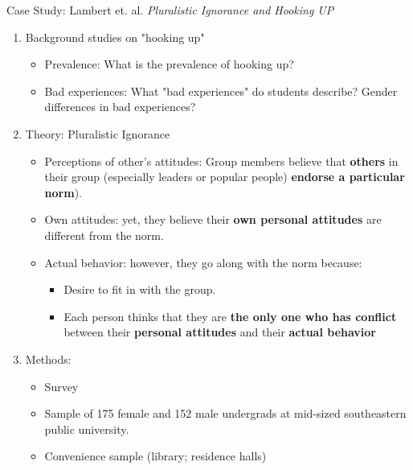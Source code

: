 \documentclass[12pt,a4paper]{article}
\begin{document}
\begin{enumerate}
\begin{enumerate}
\begin{eg}{Case Study: Lambert et. al. \textit{Pluralistic Ignorance and Hooking UP}}
\begin{enumerate}
\begin{itemize}
					\item In the post, research has assumed that sex without love is a problem (goes against norms). 
					\item Today, on college campuses, this kind of behavior ("hooking up") has become normative.
					\begin{df}{Hooking up}
						Hooking up occurs when two people who are casual acquaintances engage in some forms of sexual behavior with the expectation of no future commitment. 	
					\end{df}
				\end{itemize}
				\item Background studies on "hooking up"
				\begin{itemize}
					\item Prevalence: What is the prevalence of hooking up? 
					\item Bad experiences: What "bad experiences" do students describe? Gender differences in bad experiences? 	
				\end{itemize}
				\item Theory: Pluralistic Ignorance
				\begin{itemize}
					\item Perceptions of other's attitudes: Group members believe that \textbf{others} in their group (especially leaders or popular people) \textbf{endorse a particular norm}). 
					\item Own attitudes: yet, they believe their \textbf{own personal attitudes} are different from the norm.
					\item Actual behavior: however, they go along with the norm because: 
					\begin{itemize}
						\item Desire to fit in with the group.
						\item Each person thinks that they are \textbf{the only one who has conflict} between their \textbf{personal attitudes} and their \textbf{actual behavior}
					\end{itemize}
				\end{itemize}
				\item Methods: 
				\begin{itemize}
					\item Survey
					\item Sample of 175 female and 152 male undergrads at mid-sized southeastern public university.
					\item Convenience sample (library; residence halls)
				\end{itemize}

\end{enumerate}
\end{eg}
\end{enumerate}
\end{enumerate}
\end{document}
